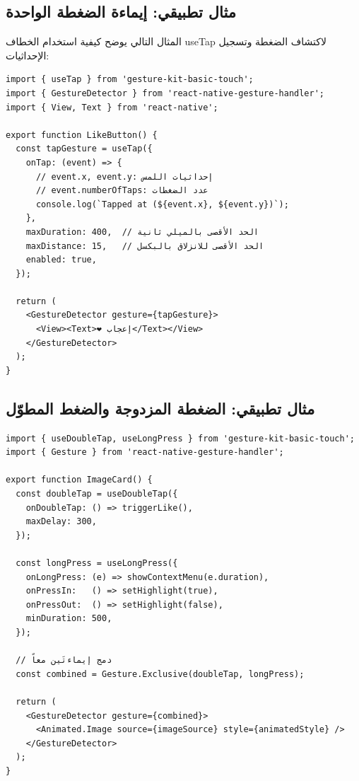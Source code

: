 \begin{Arabic}
\subsection{مثال تطبيقي: إيماءة الضغطة الواحدة}

المثال التالي يوضح كيفية استخدام الخطاف \textenglish{useTap} لاكتشاف الضغطة وتسجيل الإحداثيات:

\begin{english}
\begin{verbatim}
import { useTap } from 'gesture-kit-basic-touch';
import { GestureDetector } from 'react-native-gesture-handler';
import { View, Text } from 'react-native';

export function LikeButton() {
  const tapGesture = useTap({
    onTap: (event) => {
      // event.x, event.y: إحداثيات اللمس
      // event.numberOfTaps: عدد الضغطات
      console.log(`Tapped at (${event.x}, ${event.y})`);
    },
    maxDuration: 400,  // الحد الأقصى بالميلي ثانية
    maxDistance: 15,   // الحد الأقصى للانزلاق بالبكسل
    enabled: true,
  });

  return (
    <GestureDetector gesture={tapGesture}>
      <View><Text>❤️ إعجاب</Text></View>
    </GestureDetector>
  );
}
\end{verbatim}
\end{english}

\subsection{مثال تطبيقي: الضغطة المزدوجة والضغط المطوّل}

\begin{english}
\begin{verbatim}
import { useDoubleTap, useLongPress } from 'gesture-kit-basic-touch';
import { Gesture } from 'react-native-gesture-handler';

export function ImageCard() {
  const doubleTap = useDoubleTap({
    onDoubleTap: () => triggerLike(),
    maxDelay: 300,
  });

  const longPress = useLongPress({
    onLongPress: (e) => showContextMenu(e.duration),
    onPressIn:   () => setHighlight(true),
    onPressOut:  () => setHighlight(false),
    minDuration: 500,
  });

  // دمج إيماءتَين معاً
  const combined = Gesture.Exclusive(doubleTap, longPress);

  return (
    <GestureDetector gesture={combined}>
      <Animated.Image source={imageSource} style={animatedStyle} />
    </GestureDetector>
  );
}
\end{verbatim}
\end{english}


\end{Arabic}
